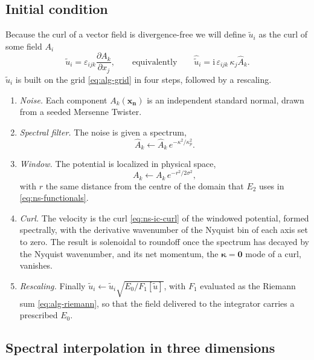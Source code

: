 \documentclass{article}
\begin{document}
\subsection{Initial condition}\label{ssec:ns-ic}
Because the curl of a vector field is divergence-free we will define $\tilde u_i$ as the curl of some field $A_i$
\begin{equation}\label{eq:ns-ic-curl}
  \tilde u_i = \varepsilon_{ijk} \frac{\partial A_k}{\partial x_j},
  \qquad\text{equivalently}\qquad
  \hat{\tilde u}_i = \mathrm{i}\, \varepsilon_{ijk}\, \kappa_j \hat{A}_k.
\end{equation}
$\tilde u_i$ is built on the grid \eqref{eq:alg-grid} in four steps, followed
by a rescaling.
\begin{enumerate}
  \item \emph{Noise.} Each component $A_k(\mathbf{x_n})$ is an independent
  standard normal, drawn from a seeded Mersenne Twister.  
  \item \emph{Spectral filter.} The noise is given a spectrum,
  \begin{equation}\label{eq:ns-ic-filter}
    \hat{A}_k \gets \hat{A}_k\, e^{-\kappa^2/\kappa_p^2}.
  \end{equation}
  \item \emph{Window.} The potential is localized in physical space,
  \begin{equation}\label{eq:ns-ic-window}
    A_k \gets A_k\, e^{-r^2/2\sigma^2},
  \end{equation}
  with $r$ the same distance from the centre of the domain that $E_2$ uses in
  \eqref{eq:ns-functionals}.
  \item \emph{Curl.} The velocity is the curl \eqref{eq:ns-ic-curl} of the
  windowed potential, formed spectrally, with the derivative wavenumber of
  the Nyquist bin of each axis set to zero. The result is solenoidal to
  roundoff once the spectrum has decayed by the Nyquist wavenumber, and its
  net momentum, the $\boldsymbol{\kappa} = \mathbf{0}$ mode of a curl, vanishes.
  \item \emph{Rescaling.} Finally $\tilde u_i \gets \tilde u_i \sqrt{E_0 / F_1[\tilde u]}$,
  with $F_1$ evaluated as the Riemann sum \eqref{eq:alg-riemann}, so that the
  field delivered to the integrator carries a prescribed $E_0$.
\end{enumerate}
\subsection{Spectral interpolation in three dimensions}\label{ssec:ns-interpolation}
\end{document}
